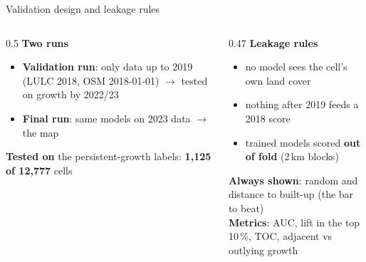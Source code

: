 \documentclass[aspectratio=169,11pt]{beamer}
\newcommand{\hl}[1]{\alert{\textbf{#1}}}
\begin{document}
\begin{frame}{Validation design and leakage rules}
  \small
  \begin{columns}[T]
    \begin{column}{0.5\textwidth}
      \textbf{Two runs}
      \begin{itemize}
        \item \hl{Validation run}: only data up to 2019 (LULC 2018, OSM 2018-01-01)
              $\rightarrow$ tested on growth by 2022/23
        \item \textbf{Final run}: same models on 2023 data $\rightarrow$ the map
      \end{itemize}
      \textbf{Tested on} the persistent-growth labels: \hl{1,125 of 12,777} cells
    \end{column}
    \begin{column}{0.47\textwidth}
      \textbf{Leakage rules}
      \begin{itemize}
        \item no model sees the cell's own land cover
        \item nothing after 2019 feeds a 2018 score
        \item trained models scored \hl{out of fold} (2\,km blocks)
      \end{itemize}
      \textbf{Always shown}: random and distance to built-up (the bar to beat)\\[0.2em]
      \textbf{Metrics}: AUC, lift in the top 10\,\%, TOC, adjacent vs outlying growth
    \end{column}
  \end{columns}
\end{frame}

\end{document}
